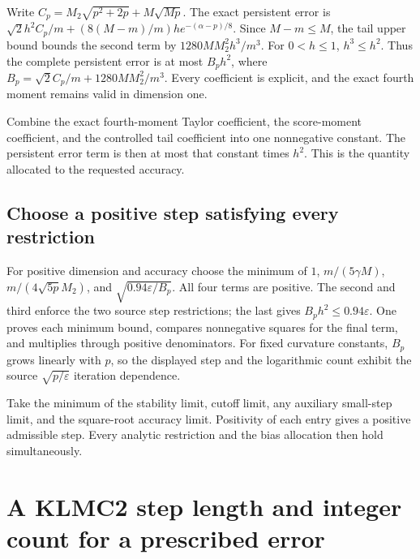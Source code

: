\documentclass[11pt,a4paper]{report}
\begin{document}
Write \(C_p=M_2\sqrt{p^2+2p}+M\sqrt{Mp}\). The exact persistent error is \(\sqrt2h^2C_p/m+(8(M-m)/m)h e^{-(\alpha-p)/8}\). Since \(M-m\le M\), the tail upper bound bounds the second term by \(1280MM_2^2h^3/m^3\). For \(0<h\le1\), \(h^3\le h^2\). Thus the complete persistent error is at most \(B_ph^2\), where \(B_p=\sqrt2 C_p/m+1280MM_2^2/m^3\). Every coefficient is explicit, and the exact fourth moment remains valid in dimension one.



Combine the exact fourth-moment Taylor coefficient, the score-moment coefficient, and the controlled tail coefficient into one nonnegative constant. The persistent error term is then at most that constant times \(h^2\). This is the quantity allocated to the requested accuracy.

\subsection{\texorpdfstring{Choose a positive step satisfying every restriction}{Choose a positive step satisfying every restriction}}
\label{report-step-KineticLangevin-SecondOrderBudget-lean-3}


For positive dimension and accuracy choose the minimum of \(1\), \(m/(5\gamma M)\), \(m/(4\sqrt{5p}M_2)\), and \(\sqrt{0.94\varepsilon/B_p}\). All four terms are positive. The second and third enforce the two source step restrictions; the last gives \(B_ph^2\le0.94\varepsilon\). One proves each minimum bound, compares nonnegative squares for the final term, and multiplies through positive denominators. For fixed curvature constants, \(B_p\) grows linearly with \(p\), so the displayed step and the logarithmic count exhibit the source \(\sqrt{p/\varepsilon}\) iteration dependence.



Take the minimum of the stability limit, cutoff limit, any auxiliary small-step limit, and the square-root accuracy limit. Positivity of each entry gives a positive admissible step. Every analytic restriction and the bias allocation then hold simultaneously.

\section{\texorpdfstring{A KLMC2 step length and integer count for a prescribed error}{A KLMC2 step length and integer count for a prescribed error}}
\label{proof-module-KineticLangevin-SecondOrderAccuracy-lean}
\end{document}
